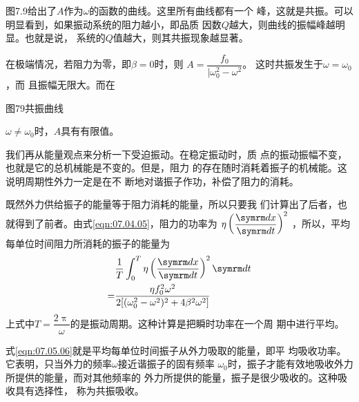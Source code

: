 图7.9给出了$ A $作为$ \omega $的函数的曲线。这里所有曲线都有一个
峰，这就是共振。可以明显看到，如果振动系统的阻力越小，即品质
因数$ Q $越大，则曲线的振幅峰越明显。也就是说，
系统的$ Q $值越大，则其共振现象越显著。

在极端情况，若阻力为零，即$ \beta = 0 $时，则
$ A = \dfrac { f _ { 0 } } { | \omega_{ 0 } ^ { 2 } - \omega ^ { 2 } } $。
这时共振发生于$ \omega = \omega _ { 0 } $，而
且振幅无限大。而在

图79共振曲线

$ \omega \ne \omega _ { 0 } $时，$ A $具有有限值。

我们再从能量观点来分析一下受迫振动。在稳定振动时，质
点的振动振幅不变，也就是它的总机械能是不变的。但是，阻力
的存在随时消耗着振子的机械能。这说明周期性外力一定是在不
断地对谐振子作功，补偿了阻力的消耗。

既然外力供给振子的能量等于阻力消耗的能量，所以只要我
们计算出了后者，也就得到了前者。由式\eqref{eqn:07.04.05}，阻力的功率为
$ \eta \left( \dfrac { \dif x } { \dif t } \right) ^ { 2 } $
，所以，平均每单位时间阻力所消耗的振子的能量为
\begin{equation}\label{eqn:07.05.06}
    \begin{aligned}
        &\frac { 1 } { T } \int _ { 0 } ^ { T } \eta  \left( \frac { \dif x } { \dif t } \right) ^ { 2 } \dif t \\
     = &\frac { \eta f _ { 0 } ^ { 2 } \omega ^ { 2 } } { 2 [ ( \omega_{ 0 } ^ { 2 } - \omega ^ { 2 } ) ^ { 2 } + 4 \beta ^ { 2 } \omega ^ { 2 } ] }
    \end{aligned}
\end{equation}
上式中$ T = \dfrac { 2 \uppi } { \omega } $的是振动周期。这种计算是把瞬时功率在一个周
期中进行平均。

式\eqref{eqn:07.05.06}就是平均每单位时间振子从外力吸取的能量，即平
均吸收功率。它表明，只当外力的频率$ \omega $接近谐振子的固有频率
$ \omega_{ 0 } $时，振子才能有效地吸收外力所提供的能量，而对其他频率的
外力所提供的能量，振子是很少吸收的。这种吸收具有选择性，
称为共振吸收。

